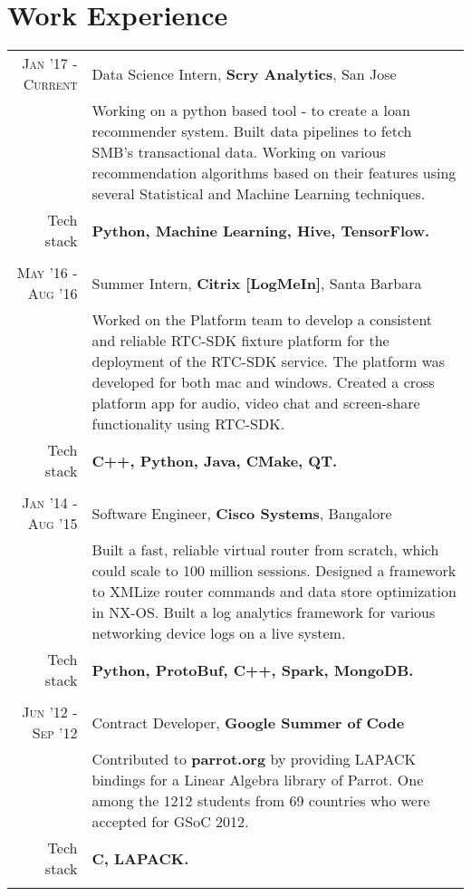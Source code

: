 \section{Work Experience}
\renewcommand{\arraystretch}{0.85}%
\begin{tabular}{r|p{14cm}}

\textsc{Jan '17 - Current} & Data Science Intern, \textbf{Scry Analytics}, San Jose\\
& \small{Working on a python based tool - to create a loan recommender system. Built data pipelines to fetch SMB's transactional data. Working on various recommendation algorithms based on their features using several Statistical and Machine Learning techniques.}\\
\small{Tech stack} &\footnotesize{\textbf{Python, Machine Learning, Hive, TensorFlow.}} \\
\multicolumn{2}{c}{} \\

\textsc{May '16 - Aug '16} & Summer Intern, \textbf{Citrix [LogMeIn]}, Santa Barbara\\
& \small{Worked on the Platform team to develop a consistent and reliable RTC-SDK fixture platform for the deployment of the RTC-SDK service. 
The platform was developed for both mac and windows. 
Created a cross platform app for audio, video chat and screen-share functionality using RTC-SDK.}\\
\small{Tech stack} &\footnotesize{\textbf{C++, Python, Java, CMake, QT.}} \\
\multicolumn{2}{c}{} \\

\textsc{Jan '14 - Aug '15 } & Software Engineer, \textbf{Cisco Systems}, Bangalore \\
& \small{Built a fast, reliable virtual router from scratch, which could scale to 100 million sessions.	Designed a framework to XMLize router commands and data store optimization in NX-OS. Built a log analytics framework for various networking device logs on a live system.}\\
\small{Tech stack} &\footnotesize{\textbf{Python, ProtoBuf, C++, Spark, MongoDB.}} \\
\multicolumn{2}{c}{} \\

\textsc{Jun '12 - Sep '12} & Contract Developer, \textbf{Google Summer of Code}\\
& \small{Contributed to \textbf{parrot.org} by providing LAPACK bindings for a Linear Algebra library of Parrot. One among the 1212 students from 69 countries who were accepted for GSoC 2012.}\\
\small{Tech stack} &\footnotesize{\textbf{C, LAPACK.}}\\
\multicolumn{2}{c}{}

\end{tabular}
